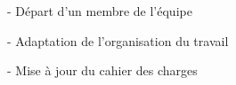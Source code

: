 
- Départ d'un membre de l'équipe

- Adaptation de l'organisation du travail

- Mise à jour du cahier des charges